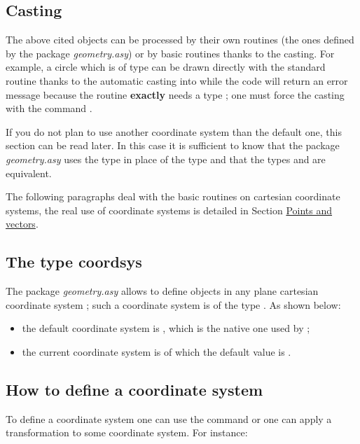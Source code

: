 \documentclass[pdftex]{article}
\newcommand{\geo}{the package \emph{geometry.asy}\xspace}
\newcommand{\Geo}{The package \emph{geometry.asy}\xspace}
\begin{document}
\subsection{Casting }
The above cited objects can be processed by their own routines (the
ones defined by \geo) or by basic \asymptote routines thanks to the casting.
For example, a circle which is of type  can be drawn
directly with the standard routine  thanks to the automatic
casting  into  while the code
 will return an error message because the
routine   {\bf exactly} needs  a type ; one must
force the casting with   the command .


If you do not plan to use another coordinate system than the default one, this
section can be read later. In this case it is sufficient to know that
\geo uses the type  in place of the type  and
that the types  and  are equivalent.

The following paragraphs deal with the basic routines on cartesian
coordinate systems, the real use of coordinate systems is detailed in Section \href{#section.point}{Points and vectors}.

\subsection{The type coordsys}
\Geo allows to define objects in any plane cartesian coordinate system ; such a
coordinate system is of the type . As shown below:
\begin{itemize}
\item  the default coordinate system is
  ,
  which is the native one used by  \asymptote;
\item the current coordinate system is   of which the
  default value is .
\end{itemize}

\subsection{How to define a coordinate system}
To define a coordinate system one can use the command
 or one can apply a transformation to some
coordinate system. For instance:
\end{document}
